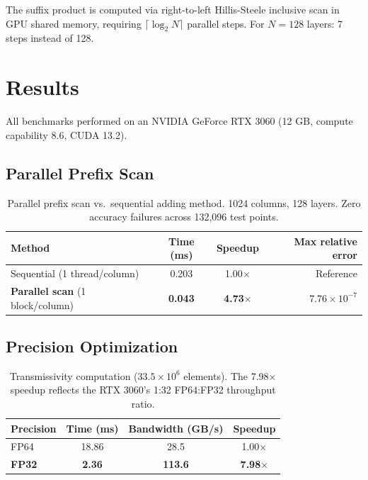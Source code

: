 \documentclass[12pt,letterpaper]{article}
\begin{document}
The suffix product is computed via right-to-left Hillis-Steele inclusive scan in GPU shared memory, requiring $\lceil \log_2 N \rceil$ parallel steps. For $N=128$ layers: 7 steps instead of 128.

\section{Results}

All benchmarks performed on an NVIDIA GeForce RTX 3060 (12 GB, compute capability 8.6, CUDA 13.2).

\subsection{Parallel Prefix Scan}

\begin{table}[h]
\centering
\begin{tabular}{lccr}
\toprule
Method & Time (ms) & Speedup & Max relative error \\
\midrule
Sequential (1 thread/column) & 0.203 & 1.00$\times$ & Reference \\
\textbf{Parallel scan} (1 block/column) & \textbf{0.043} & \textbf{4.73$\times$} & $7.76 \times 10^{-7}$ \\
\bottomrule
\end{tabular}
\caption{Parallel prefix scan vs.\ sequential adding method. 1024 columns, 128 layers. Zero accuracy failures across 132,096 test points.}
\label{tab:scan}
\end{table}

\subsection{Precision Optimization}

\begin{table}[h]
\centering
\begin{tabular}{lccc}
\toprule
Precision & Time (ms) & Bandwidth (GB/s) & Speedup \\
\midrule
FP64 & 18.86 & 28.5 & 1.00$\times$ \\
\textbf{FP32} & \textbf{2.36} & \textbf{113.6} & \textbf{7.98$\times$} \\
\bottomrule
\end{tabular}
\caption{Transmissivity computation ($33.5 \times 10^6$ elements). The 7.98$\times$ speedup reflects the RTX 3060's 1:32 FP64:FP32 throughput ratio.}
\label{tab:precision}
\end{table}
\end{document}
